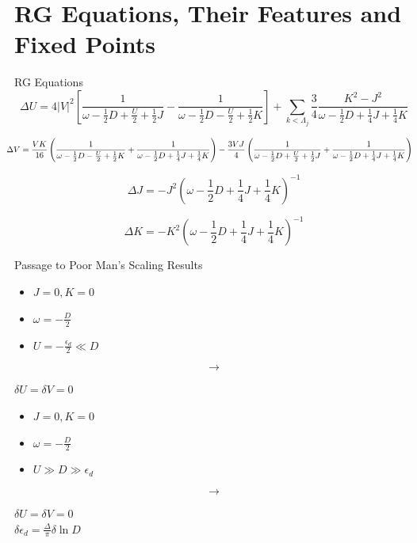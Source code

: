 \documentclass[aspectratio=169]{beamer}
\begin{document}
\section{RG Equations, Their Features and Fixed Points}
\begin{frame}[noframenumbering]{RG Equations}
\[
\Delta U = 4|V|^2 \left[\frac{1}{\omega - \frac{1}{2}D + \frac{U}{2} + \frac{1}{2}J}  - \frac{1}{\omega - \frac{1}{2}D - \frac{U}{2} + \frac{1}{2}K}\right] + \sum_{k<\Lambda_j} \frac{3}{4}\frac{K^2 - J^2}{\omega - \frac{1}{2}D + \frac{1}{4}J + \frac{1}{4}K}
\]

\[
	\hspace*{-10pt}\Delta V = \frac{V K}{16}\left(\frac{1}{\omega - \frac{1}{2}D - \frac{U}{2} + \frac{1}{2}K} + \frac{1}{\omega - \frac{1}{2}D + \frac{1}{4}J + \frac{1}{4}K} \right) - \frac{3VJ}{4}\left( \frac{1}{\omega - \frac{1}{2}D + \frac{U}{2} + \frac{1}{2}J} + \frac{1}{\omega - \frac{1}{2}D + \frac{1}{4}J + \frac{1}{4}K} \right)
\]

\[
\Delta J = - J^2\left(\omega - \frac{1}{2}D + \frac{1}{4}J + \frac{1}{4}K\right)^{-1}
\]

\[
\Delta K = - K^2\left(\omega - \frac{1}{2}D + \frac{1}{4}J + \frac{1}{4}K\right)^{-1}
\]
\end{frame}

\begin{frame}{Passage to Poor Man's Scaling Results}
\begin{minipage}{0.35\textwidth}
\begin{itemize}
	\item \(J=0, K=0\)
	\item \(\omega = -\frac{D}{2}\)
	\item \(U = -\frac{\epsilon_d}{2} \ll D\)
\end{itemize}
\end{minipage}
\begin{minipage}{0.2\textwidth}
	{\LARGE \[\longrightarrow\]}
\end{minipage}
\begin{minipage}{0.35\textwidth}
	\centering
	\Large \(\delta U = \delta V = 0\)
\end{minipage}

\vspace*{30pt}
\begin{minipage}{0.35\textwidth}
\begin{itemize}
	\item \(J=0, K=0\)
	\item \(\omega = -\frac{D}{2}\)
	\item \(U \gg D \gg \epsilon_d\)
\end{itemize}
\end{minipage}
\begin{minipage}{0.2\textwidth}
	{\LARGE \[\longrightarrow\]}
\end{minipage}
\begin{minipage}{0.35\textwidth}
	\centering
	\Large\(\delta U = \delta V = 0\)\\[10pt]
	\(\delta \epsilon_d = \frac{\Delta}{\pi}\delta \ln{D}\)

\end{minipage}
\end{frame}
\end{document}

